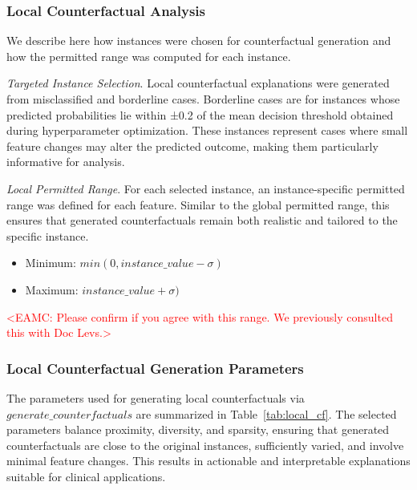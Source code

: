 \documentclass[fleqn,10pt]{wlscirep}
\begin{document}
\subsubsection*{Local Counterfactual Analysis}
We describe here how instances were chosen for counterfactual generation and how the permitted range was computed for each instance.

\textit{Targeted Instance Selection}.
Local counterfactual explanations were generated from misclassified and borderline cases. Borderline cases are for instances whose predicted probabilities lie within ±0.2 of the mean decision threshold obtained during hyperparameter optimization. These instances represent cases where small feature changes may alter the predicted outcome, making them particularly informative for analysis.

\textit{Local Permitted Range}.
For each selected instance, an instance-specific permitted range was defined for each feature. Similar to the global permitted range, this ensures that generated counterfactuals remain both realistic and tailored to the specific instance.

\begin{itemize}
    \itemsep0em 
    \item Minimum: $min(0, instance\_value - \sigma)$
    \item Maximum: $ instance\_value + \sigma)$
\end{itemize}
\textcolor{red}{<EAMC: Please confirm if you agree with this range. We previously consulted this with Doc Levs.>}

\subsubsection*{Local Counterfactual Generation Parameters}
The parameters used for generating local counterfactuals via $generate\_counterfactuals$ are summarized in Table~\ref{tab:local_cf}. The selected parameters balance proximity, diversity, and sparsity, ensuring that generated counterfactuals are close to the original instances, sufficiently varied, and involve minimal feature changes. This results in actionable and interpretable explanations suitable for clinical applications.
\end{document}
